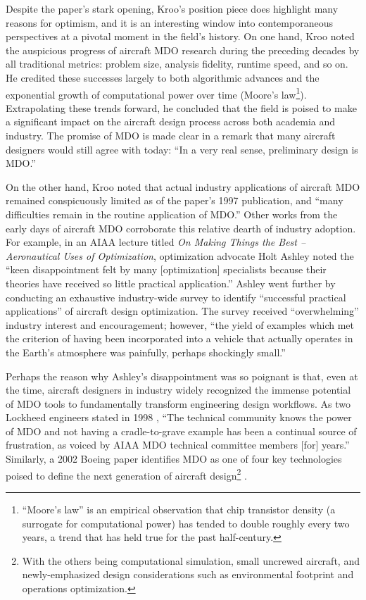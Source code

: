 Despite the paper's stark opening, Kroo's position piece does highlight many reasons for optimism, and it is an interesting window into contemporaneous perspectives at a pivotal moment in the field's history. On one hand, Kroo noted the auspicious progress of aircraft MDO research during the preceding decades by all traditional metrics: problem size, analysis fidelity, runtime speed, and so on. He credited these successes largely to both algorithmic advances and the exponential growth of computational power over time (Moore's law\footnote{``Moore's law'' is an empirical observation that chip transistor density (a surrogate for computational power) has tended to double roughly every two years, a trend that has held true for the past half-century.}). Extrapolating these trends forward, he concluded that the field is poised to make a significant impact on the aircraft design process across both academia and industry. The promise of MDO is made clear in a remark that many aircraft designers would still agree with today: ``In a very real sense, preliminary design is MDO.'' \cite{kroo_multidisciplinary_1997}

On the other hand, Kroo noted that actual industry applications of aircraft MDO remained conspicuously limited as of the paper's 1997 publication, and ``many difficulties remain in the routine application of MDO.'' \cite{kroo_multidisciplinary_1997} Other works from the early days of aircraft MDO corroborate this relative dearth of industry adoption. For example, in an AIAA lecture titled \textit{On Making Things the Best -- Aeronautical Uses of Optimization}, optimization advocate Holt Ashley noted the ``keen disappointment felt by many [optimization] specialists because their theories have received so little practical application.'' \cite{ashley_making_1982} Ashley went further by conducting an exhaustive industry-wide survey to identify ``successful practical applications'' of aircraft design optimization. The survey received ``overwhelming'' industry interest and encouragement; however, ``the yield of examples which met the criterion of having been incorporated into a vehicle that actually operates in the Earth's atmosphere was painfully, perhaps shockingly small.''

Perhaps the reason why Ashley's disappointment was so poignant is that, even at the time, aircraft designers in industry widely recognized the immense potential of MDO tools to fundamentally transform engineering design workflows. As two Lockheed engineers stated in 1998 \cite{radovcich_f22_1998}, ``The technical community knows the power of MDO and not having a cradle-to-grave example has been a continual source of frustration, as voiced by AIAA MDO technical committee members [for] years.'' Similarly, a 2002 Boeing paper identifies MDO as one of four key technologies poised to define the next generation of aircraft design\footnote{With the others being computational simulation, small uncrewed aircraft, and newly-emphasized design considerations such as environmental footprint and operations optimization.} \cite{mcmasters_airplane_2002}.


